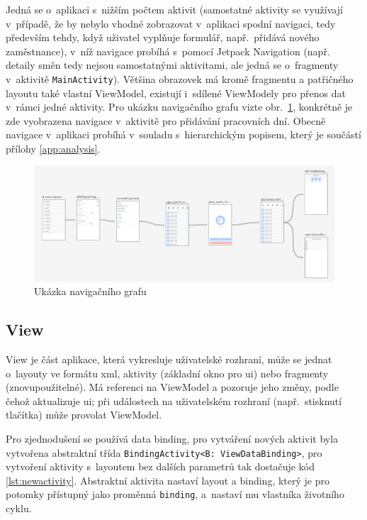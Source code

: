 \documentclass[a4paper,11pt,openany,twoside]{book}
\begin{document}
Jedná se o~aplikaci s~nižším počtem aktivit (samostatné aktivity se využívají v~případě, že by nebylo vhodné zobrazovat v~aplikaci spodní navigaci, tedy především tehdy, když uživatel vyplňuje formulář, např.~přidává nového zaměstnance), v~níž navigace probíhá s~pomocí Jetpack Navigation (např. detaily směn tedy nejsou sa\-mos\-tat\-ný\-mi aktivitami, ale jedná se o~fragmenty v~aktivitě \texttt{MainActivity}). Většina obrazovek má kromě fragmentu a patřičného layoutu také vlastní ViewModel, existují i~sdílené ViewModely pro přenos dat v~rámci jedné aktivity. Pro ukázku navigačního grafu vizte obr.~\ref{fig:navigation-graph}, konkrétně je zde vyobrazena navigace v~aktivitě pro přidávání pracovních dní. Obecně navigace v~aplikaci probíhá v~souladu s~hierarchickým popisem, který je součástí přílohy \ref{app:analysis}.

\begin{figure}[h]
	\centering
	\includegraphics[width=\textwidth]{img/navigation-component.png}
	\caption{Ukázka navigačního grafu}
	\label{fig:navigation-graph}
\end{figure}

\subsection{View}

View je část aplikace, která vykresluje uživatelské rozhraní, může se jednat o~layouty ve formátu \acs{xml}, aktivity (základní okno pro \acs{ui}) nebo fragmenty (znovupoužitelné). Má referenci na ViewModel a pozoruje jeho změny, podle čehož aktualizuje \acs{ui}; při událostech na uživatelském rozhraní (např.~stisknutí tlačítka) může provolat ViewModel.

Pro zjednodušení se používá data binding, pro vytváření nových aktivit byla vytvořena abstraktní třída \texttt{BindingActivity<B: ViewDataBinding>}, pro vytvoření aktivity s~layoutem bez dalších parametrů tak dostačuje kód \ref{lst:newactivity}. Abstraktní aktivita nastaví layout a binding, který je pro potomky přístupný jako proměnná \texttt{binding}, a~nastaví mu vlastníka životního cyklu.
\end{document}
